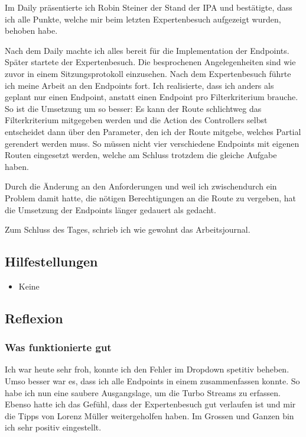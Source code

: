 Im Daily präsentierte ich Robin Steiner der Stand der IPA und bestätigte, dass ich alle Punkte, welche mir beim letzten Expertenbesuch aufgezeigt wurden, behoben habe.

Nach dem Daily machte ich alles bereit für die Implementation der Endpoints. Später startete der Expertenbesuch. Die besprochenen Angelegenheiten sind wie zuvor in einem Sitzungsprotokoll
einzusehen. Nach dem Expertenbesuch führte ich meine Arbeit an den Endpoints fort. Ich realisierte, dass ich anders als geplant nur einen Endpoint, anstatt einen Endpoint pro Filterkriterium brauche.
So ist die Umsetzung um so besser: Es kann der Route schlichtweg das Filterkriterium mitgegeben werden und die Action des Controllers selbst entscheidet dann über den Parameter, den ich der Route
mitgebe, welches Partial gerendert werden muss. So müssen nicht vier verschiedene Endpoints mit eigenen Routen eingesetzt werden, welche am Schluss trotzdem die gleiche Aufgabe haben.

Durch die Änderung an den Anforderungen und weil ich zwischendurch ein Problem damit hatte, die nötigen Berechtigungen an die Route zu vergeben, hat die Umsetzung der Endpoints länger gedauert
als gedacht.

Zum Schluss des Tages, schrieb ich wie gewohnt das Arbeitsjournal.

\subsection*{Hilfestellungen}
\begin{itemize}
    \item Keine
\end{itemize}

\subsection*{Reflexion}

\subsubsection*{Was funktionierte gut}
Ich war heute sehr froh, konnte ich den Fehler im Dropdown spetitiv beheben. Umso besser war es, dass ich alle Endpoints in einem zusammenfassen konnte. 
So habe ich nun eine saubere Ausgangslage, um die Turbo Streams zu erfassen. Ebenso hatte ich das Gefühl, dass der Expertenbesuch gut verlaufen ist und mir 
die Tipps von Lorenz Müller weitergeholfen haben. Im Grossen und Ganzen bin ich sehr positiv eingestellt.

